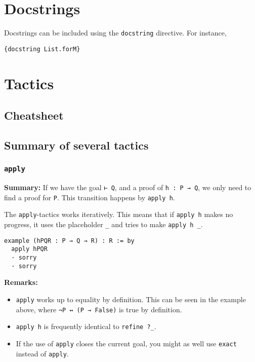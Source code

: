 \documentclass{memoir}
\begin{document}
\chapter{Docstrings}

Docstrings can be included using the \Verb|docstring| directive. For instance,

\begin{verbatim}
{docstring List.forM}

\end{verbatim}





\chapter{Tactics}



\section{Cheatsheet}





\section{Summary of several tactics}



\subsection{\Verb|apply|}

\textbf{Summary:} If we have the goal \Verb|⊢ Q|, and a proof of \Verb|h : P → Q|, we only need to find a proof for \Verb|P|. This transition happens by \Verb|apply h|.



The \Verb|apply|-tactics works iteratively. This means that if \Verb|apply h| makes no progress, it uses the placeholder \Verb|_| and tries to make \Verb|apply h _|.

\begin{verbatim}
example (hPQR : P → Q → R) : R := by
  apply hPQR
  · sorry
  · sorry

\end{verbatim}



\textbf{Remarks:}

\begin{itemize}
\item \Verb|apply| works up to equality by definition. This can be seen in the example above, where \Verb|¬P ↔ (P → False)| is true by definition.\item \Verb|apply h| is frequently identical to \Verb|refine ?_|.\item If the use of \Verb|apply| closes the current goal, you might as well use \Verb|exact| instead of \Verb|apply|.

\end{itemize}
\end{document}
